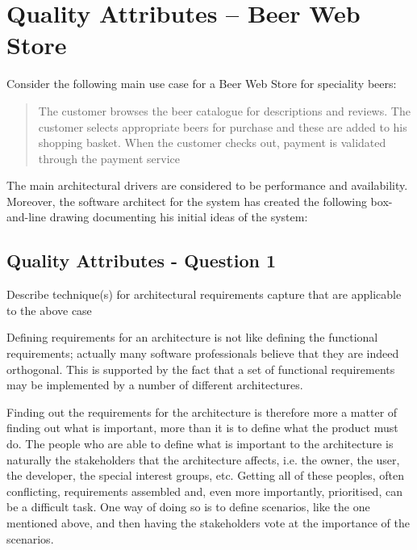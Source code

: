 \section{Quality Attributes -- Beer Web Store}

Consider the following main use case for a Beer Web Store for speciality
beers:

\begin{quote}
  The customer browses the beer catalogue for descriptions and
  reviews. The customer selects appropriate beers for purchase and
  these are added to his shopping basket. When the customer checks
  out, payment is validated through the payment service
\end{quote}
The main architectural drivers are considered to be performance and
availability. Moreover, the software architect for the system has
created the following box-and-line drawing documenting his initial
ideas of the system:
\begin{figure}[h!]
  \centerline{}
\end{figure}

\subsection{Quality Attributes - Question 1}

\begin{question}
Describe technique(s) for architectural requirements capture
that are applicable to the above case
\end{question}

Defining requirements for an architecture is not like defining the functional requirements; actually many software professionals believe that they are indeed orthogonal. This is supported by the fact that a set of functional requirements may be implemented by a number of different architectures.

Finding out the requirements for the architecture is therefore more a matter of finding out what is important, more than it is to define what the product must do. The people who are able to define what is important to the architecture is naturally the stakeholders that the architecture affects, i.e. the owner, the user, the developer, the special interest groups, etc. Getting all of these peoples, often conflicting, requirements assembled and, even more importantly, prioritised, can be a difficult task. One way of doing so is to define scenarios, like the one mentioned above, and then having the stakeholders vote at the importance of the scenarios. 

